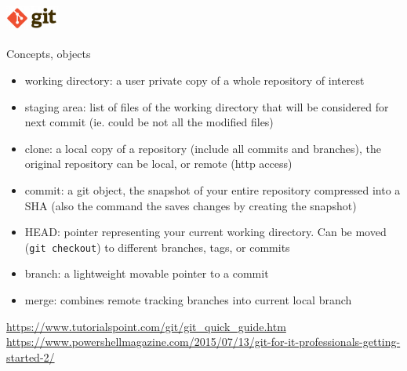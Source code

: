 \begin{frame}[containsverbatim]
\frametitle{\includegraphics[height=0.8cm]{shared/logo-git.png}}
\begin{block}{Concepts, objects}
\begin{itemize}
    \item working directory: a user private copy of a whole repository of interest
    \item staging area: list of files of the working directory that will be considered for next commit (ie. could be not all the modified files)
    \item clone: a local copy of a repository (include all commits and branches), the original repository can be local, or remote (http access)
    \item commit: a git object, the snapshot of your entire repository compressed into a SHA (also the command the saves changes by creating the snapshot)
    \item HEAD: pointer representing your current working directory. Can be moved (\verb|git checkout|) to different branches, tags, or commits 
    \item branch: a lightweight movable pointer to a commit
    \item merge: combines remote tracking branches into current local branch
\end{itemize}
\end{block}
\tiny{
   \url{https://www.tutorialspoint.com/git/git_quick_guide.htm}\\
   \url{https://www.powershellmagazine.com/2015/07/13/git-for-it-professionals-getting-started-2/}
}
\end{frame}

